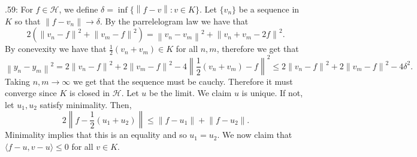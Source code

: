 \documentclass[letterpaper]{article}
\newcommand{\lan}{\langle}
\newcommand{\ran}{\rangle}
\newcommand{\norm}[1]{\left\lVert#1\right\rVert}
\newcommand{\inn}[1]{\lan#1\ran}
\begin{document}
 .59: For $f \in \mathcal{H}$, we define $\delta = \inf\{\norm{f-v}: v\in K \}$. 
Let $\{v_n\}$ be a sequence in $K$ so that $\norm{f- v_n} \to \delta$. By the parrelelogram law we have that 
$$2(\norm{v_n-f}^2 + \norm{v_m - f}^2) = \norm{v_n-v_m}^2 + \norm{v_n+v_m -2f}^2. $$
By conevexity we have that $\frac{1}{2}(v_n+v_m) \in K$ for all $n,m$, therefore we get that 
$$\norm{y_n-y_m}^2 = 2\norm{v_n-f}^2 + 2\norm{v_m - f}^2 - 4 \norm{\frac{1}{2}(v_n+v_m) - f}^2 \leq 2\norm{v_n - f}^2 + 2\norm{v_m-f}^2 - 4\delta^2.$$
Taking $n,m\to \infty$ we get that the sequence must be cauchy. Therefore it must converge since $K$ is closed in $\mathcal{H}$. Let $u$ be the limit. We claim $u$ is unique. 
If not, let $u_1,u_2$ satisfy minimality. Then, $$2 \norm{f - \frac{1}{2}(u_1+u_2)} \leq \norm{f-u_1} + \norm{f-u_2}.$$
Minimality implies that this is an equality and so $u_1 = u_2$. 
We now claim that $\inn{f-u,v-u}\leq 0 $ for all $v\in K$. 
\end{document}
